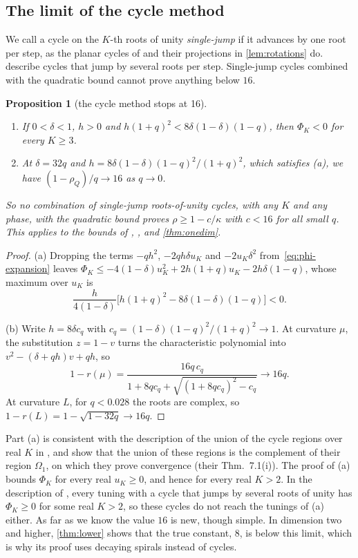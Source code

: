 \documentclass[11pt, a4paper]{article}
\newtheorem{proposition}{Proposition}
\theoremstyle{definition}
\begin{document}
\subsection{The limit of the cycle method}

We call a cycle on the $K$-th roots of unity \emph{single-jump} if it advances by one root per step, as the planar
cycles of \citet{goujaud2025provable} and their projections in \cref{lem:rotations} do. 
describe cycles that jump by several roots per step. Single-jump cycles combined with the quadratic bound cannot
prove anything below $16$.

\begin{proposition}[the cycle method stops at 16]
  \label{prop:limit}
  \leavevmode
  \begin{enumerate}[label=(\alph*)]
    \item If $0<\delta<1$, $h>0$ and $h(1+q)^2<8\delta(1-\delta)(1-q)$, then $\Phi_K<0$ for every $K\ge3$.
    \item At $\delta=32q$ and $h=8\delta(1-\delta)(1-q)^2/(1+q)^2$, which satisfies (a), we have $(1-\rho_Q)/q\to16$ as
          $q\to0$.
  \end{enumerate}
  So no combination of single-jump roots-of-unity cycles, with any $K$ and any phase, with the quadratic bound proves
  $\rho\ge1-c/\kappa$ with $c<16$ for all small $q$. This applies to the bounds of \citet{goujaud2025provable},
  \citet{fotopoulos2026cycling}, \citet{liu2026sharp} and \cref{thm:onedim}.
\end{proposition}

\begin{proof}
  (a) Dropping the terms $-qh^2$, $-2qh\delta u_K$ and $-2u_K\delta^2$ from~\eqref{eq:phi-expansion} leaves
  $\Phi_K\le-4(1-\delta)u_K^2+2h(1+q)u_K-2h\delta(1-q)$, whose maximum over $u_K$ is
  \[
    \frac{h}{4(1-\delta)}\bigl[h(1+q)^2-8\delta(1-\delta)(1-q)\bigr]<0.
  \]

  (b) Write $h=8\delta c_q$ with $c_q=(1-\delta)(1-q)^2/(1+q)^2\to1$. At curvature $\mu$, the substitution $z=1-v$ turns
  the characteristic polynomial into $v^2-(\delta+qh)v+qh$, so
  \[
    1-r(\mu)=\frac{16q\,c_q}{1+8qc_q+\sqrt{(1+8qc_q)^2-c_q}}\to16q.
  \]
  At curvature $L$, for $q<0.028$ the roots are complex, so $1-r(L)=1-\sqrt{1-32q}\to16q$.
\end{proof}

Part (a) is consistent with the description of the union of the cycle regions over real $K$ in
\citet[eqs.~(10.22)--(10.23)]{goujaud2024thesis}, and \citet[§7.4]{pasechniuk2026two} show that the union of these
regions is the complement of their region $\Omega_1$, on which they prove convergence (their Thm.~7.1(i)). The proof of
(a) bounds $\Phi_K$ for every real $u_K\ge0$, and hence for every real $K>2$. In the description of
\citet[§7.4 and Thm.~7.1(ii)]{pasechniuk2026two}, every tuning with a cycle that jumps by several roots of unity has
$\Phi_K\ge0$ for some real $K>2$, so these cycles do not reach the tunings of (a) either. As far as we know
the value $16$ is new, though simple. In dimension two and higher, \cref{thm:lower} shows that the true constant, $8$,
is below this limit, which is why its proof uses decaying spirals instead of cycles.
\end{document}

